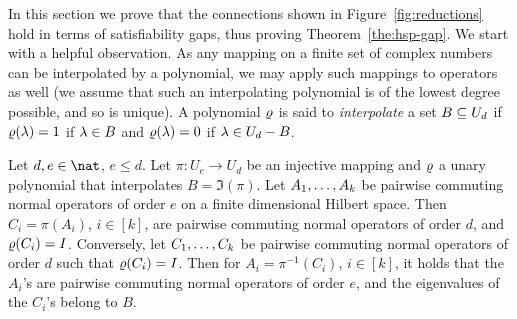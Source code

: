 \documentclass[11pt,letter]{article}
\begin{document}
In this section we prove that the connections shown in
Figure~\ref{fig:reductions} hold in terms of satisfiability gaps, thus proving
Theorem~\ref{the:hsp-gap}. We start with a helpful observation. As any mapping on a finite set of complex numbers can be interpolated by a polynomial, we may apply such mappings to operators as well (we assume that such an interpolating polynomial is of the lowest degree possible, and so is unique). A polynomial $\varrho$ is said to \emph{interpolate} a set $B\subseteq U_d$ if $\varrho(\lambda)=1$ if $\lambda\in B$ and $\varrho(\lambda)=0$ if $\lambda\in U_d-B$.

\begin{lemma}\label{lem:mapping}
Let $d,e\in\nat$, $e\le d$. 
Let $\pi:U_e\to U_d$ be an injective mapping and $\varrho$ a unary polynomial that interpolates $B=\Im(\pi)$.  Let $A _1,\ldots, A _{k}$ be pairwise commuting normal operators of order $e$ on a finite dimensional Hilbert space. Then $C_i=\pi(A_i)$, $i\in[k]$, are pairwise commuting normal operators of order $d$, and $\varrho(C_i)=I$. Conversely, let $C _1,\ldots, C _{k}$ be pairwise commuting normal operators of order $d$ such that $\varrho(C_i)=I$. Then for $A_i=\pi^{-1}(C_i)$, $i\in[k]$, it holds that the $A_i$'s are pairwise commuting normal operators of order $e$, and the eigenvalues of the $C_i$'s belong to $B$.
\end{lemma}
\end{document}
